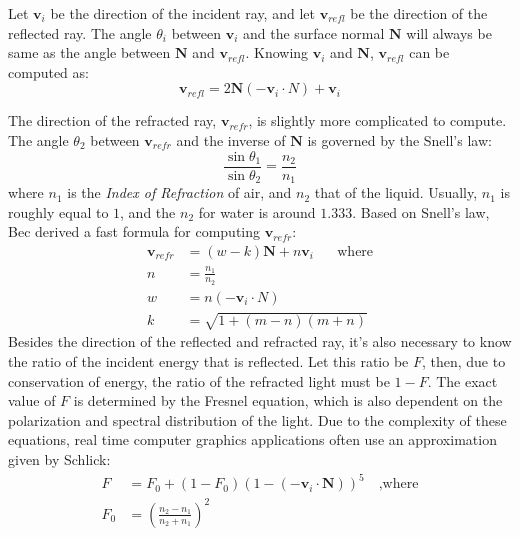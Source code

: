 Let $\textbf{v}_i$ be the direction of the incident ray, and let $\textbf{v}_{refl}$ be the direction of the reflected ray. The angle $\theta_i$ between $\textbf{v}_i$ and the surface normal $\textbf{N}$ will always be same as the angle between $\textbf{N}$ and $\textbf{v}_{refl}$. Knowing $\textbf{v}_i$ and $\textbf{N}$, $\textbf{v}_{refl}$ can be computed as:
\begin{equation}
    \label{eqn direction of reflection}
    \textbf{v}_{refl} = 2\textbf{N}(-\textbf{v}_i \cdot N) + \textbf{v}_i
\end{equation}

The direction of the refracted ray, $\textbf{v}_{refr}$, is slightly more complicated to compute. The angle $\theta_2$ between $\textbf{v}_{refr}$ and the inverse of $\textbf{N}$ is governed by the Snell's law:
$$
\frac{\sin\theta_1}{\sin\theta_2}=\frac{n_2}{n_1}
$$
where $n_1$ is the \textit{Index of Refraction} of air, and $n_2$ that of the liquid. Usually, $n_1$ is roughly equal to $1$, and the $n_2$ for water is around $1.333$. Based on Snell's law, Bec\cite{bec1997faster} derived a fast formula for computing $\textbf{v}_{refr}$:
\begin{equation}
    \label{eqn direction of refraction}
    \begin{aligned}
        \textbf{v}_{refr} &= (w-k)\textbf{N} + n\textbf{v}_{i}\mbox{~~~~ where}\\
        n &= \frac{n_1}{n_2}\\
        w &= n(-\textbf{v}_i \cdot N) \\
        k &= \sqrt{1+(m-n)(m+n)} 
    \end{aligned}
\end{equation}
Besides the direction of the reflected and refracted ray, it's also necessary to know the ratio of the incident energy that is reflected. Let this ratio be $F$, then, due to conservation of energy, the ratio of the refracted light must be $1-F$. The exact value of $F$ is determined by the Fresnel equation, which is also dependent on the polarization and spectral distribution of the light. Due to the complexity of these equations, real time computer graphics applications often use an approximation given by Schlick\cite{schlick1994inexpensive}:
\begin{equation}
    \label{eqn Schlick}
    \begin{aligned}
        F &= F_0 + (1-F_0)(1-(-\textbf{v}_i \cdot \textbf{N}))^5\mbox{~~~,where}\\
        F_0 &= \left(\frac{n_2-n_1}{n_2+n_1}\right)^2
    \end{aligned}
\end{equation}


